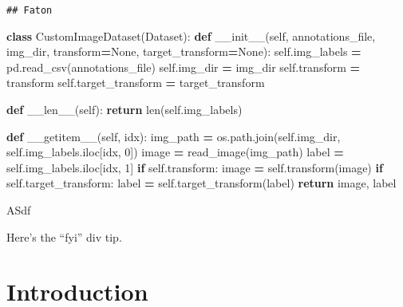 \documentclass[
]{book}
\newenvironment{Shaded}{\begin{snugshade}}{\end{snugshade}}
\newcommand{\BuiltInTok}[1]{#1}
\newcommand{\ControlFlowTok}[1]{\textcolor[rgb]{0.13,0.29,0.53}{\textbf{#1}}}
\newcommand{\DecValTok}[1]{\textcolor[rgb]{0.00,0.00,0.81}{#1}}
\newcommand{\FunctionTok}[1]{\textcolor[rgb]{0.00,0.00,0.00}{#1}}
\newcommand{\KeywordTok}[1]{\textcolor[rgb]{0.13,0.29,0.53}{\textbf{#1}}}
\newcommand{\NormalTok}[1]{#1}
\newcommand{\OperatorTok}[1]{\textcolor[rgb]{0.81,0.36,0.00}{\textbf{#1}}}
\newcommand{\VariableTok}[1]{\textcolor[rgb]{0.00,0.00,0.00}{#1}}
\begin{document}
\begin{verbatim}
## Faton
\end{verbatim}

\begin{Shaded}
\begin{Highlighting}[]
\KeywordTok{class}\NormalTok{ CustomImageDataset(Dataset):}
    \KeywordTok{def} \FunctionTok{\_\_init\_\_}\NormalTok{(}\VariableTok{self}\NormalTok{, annotations\_file, img\_dir, transform}\OperatorTok{=}\VariableTok{None}\NormalTok{, target\_transform}\OperatorTok{=}\VariableTok{None}\NormalTok{):}
        \VariableTok{self}\NormalTok{.img\_labels }\OperatorTok{=}\NormalTok{ pd.read\_csv(annotations\_file)}
        \VariableTok{self}\NormalTok{.img\_dir }\OperatorTok{=}\NormalTok{ img\_dir}
        \VariableTok{self}\NormalTok{.transform }\OperatorTok{=}\NormalTok{ transform}
        \VariableTok{self}\NormalTok{.target\_transform }\OperatorTok{=}\NormalTok{ target\_transform}

    \KeywordTok{def} \FunctionTok{\_\_len\_\_}\NormalTok{(}\VariableTok{self}\NormalTok{):}
        \ControlFlowTok{return} \BuiltInTok{len}\NormalTok{(}\VariableTok{self}\NormalTok{.img\_labels)}

    \KeywordTok{def} \FunctionTok{\_\_getitem\_\_}\NormalTok{(}\VariableTok{self}\NormalTok{, idx):}
\NormalTok{        img\_path }\OperatorTok{=}\NormalTok{ os.path.join(}\VariableTok{self}\NormalTok{.img\_dir, }\VariableTok{self}\NormalTok{.img\_labels.iloc[idx, }\DecValTok{0}\NormalTok{])}
\NormalTok{        image }\OperatorTok{=}\NormalTok{ read\_image(img\_path)}
\NormalTok{        label }\OperatorTok{=} \VariableTok{self}\NormalTok{.img\_labels.iloc[idx, }\DecValTok{1}\NormalTok{]}
        \ControlFlowTok{if} \VariableTok{self}\NormalTok{.transform:}
\NormalTok{            image }\OperatorTok{=} \VariableTok{self}\NormalTok{.transform(image)}
        \ControlFlowTok{if} \VariableTok{self}\NormalTok{.target\_transform:}
\NormalTok{            label }\OperatorTok{=} \VariableTok{self}\NormalTok{.target\_transform(label)}
        \ControlFlowTok{return}\NormalTok{ image, label}
\end{Highlighting}
\end{Shaded}

ASdf

Here's the ``fyi'' div tip.

\hypertarget{intro}{%
\chapter{Introduction}\label{intro}}
\end{document}
